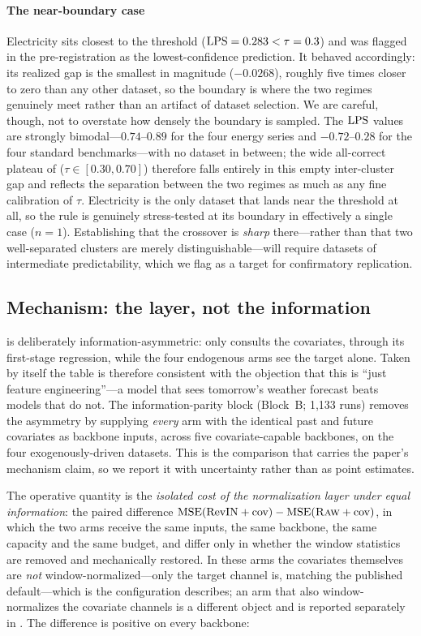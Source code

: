 \paragraph{The near-boundary case} Electricity sits closest to the threshold ($\mathrm{LPS}=0.283<\tau=0.3$) and was flagged in the pre-registration as the lowest-confidence prediction. It behaved accordingly: its realized gap is the smallest in magnitude ($-0.0268$), roughly five times closer to zero than any other dataset, so the boundary is where the two regimes genuinely meet rather than an artifact of dataset selection. We are careful, though, not to overstate how densely the boundary is sampled. The $\mathrm{LPS}$ values are strongly bimodal---$0.74$--$0.89$ for the four energy series and $-0.72$--$0.28$ for the four standard benchmarks---with no dataset in between; the wide all-correct plateau of  ($\tau\in[0.30,0.70]$) therefore falls entirely in this empty inter-cluster gap and reflects the separation between the two regimes as much as any fine calibration of $\tau$. Electricity is the only dataset that lands near the threshold at all, so the rule is genuinely stress-tested at its boundary in effectively a single case ($n=1$). Establishing that the crossover is \emph{sharp} there---rather than that two well-separated clusters are merely distinguishable---will require datasets of intermediate predictability, which we flag as a target for confirmatory replication.

\subsection{Mechanism: the layer, not the information}\label{sec:parity}

 is deliberately information-asymmetric: only \cnm{} consults the covariates, through its first-stage regression, while the four endogenous arms see the target alone. Taken by itself the table is therefore consistent with the objection that this is ``just feature engineering''---a model that sees tomorrow's weather forecast beats models that do not. The information-parity block (Block~B; 1{,}133 runs) removes the asymmetry by supplying \emph{every} arm with the identical past and future covariates as backbone inputs, across five covariate-capable backbones, on the four exogenously-driven datasets. This is the comparison that carries the paper's mechanism claim, so we report it with uncertainty rather than as point estimates.

The operative quantity is the \emph{isolated cost of the normalization layer under equal information}: the paired difference $\mathrm{MSE}(\text{RevIN}+\text{cov}) - \mathrm{MSE}(\textsc{Raw}+\text{cov})$, in which the two arms receive the same inputs, the same backbone, the same capacity and the same budget, and differ only in whether the window statistics are removed and mechanically restored. In these arms the covariates themselves are \emph{not} window-normalized---only the target channel is, matching the published default---which is the configuration  describes; an arm that also window-normalizes the covariate channels is a different object and is reported separately in . The difference is positive on every backbone:

